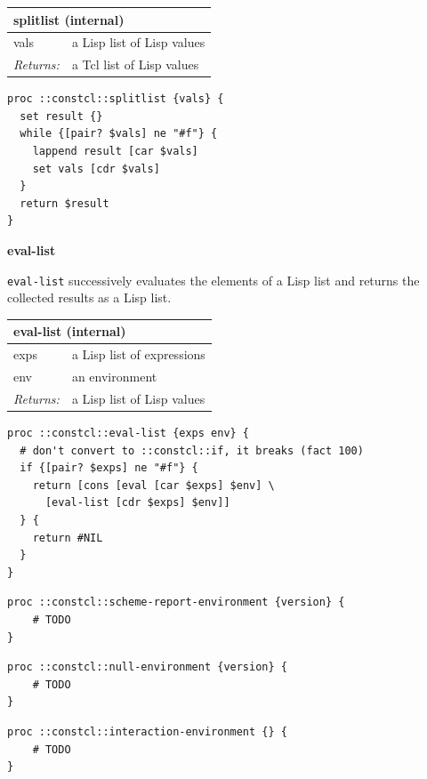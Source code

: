 \documentclass[twoside,9pt]{report}
\begin{document}
\begin{tabular}{ |l l| }
\hline
\multicolumn{2}{|l|}{splitlist (internal)} \\
\hline
vals & a Lisp list of Lisp values \\
\textit{Returns:} & a Tcl list of Lisp values \\
\hline
\end{tabular}

\noindent\makebox[\linewidth]{\rule{\linewidth}{0.4pt}}
\begin{lstlisting}
proc ::constcl::splitlist {vals} {
  set result {}
  while {[pair? $vals] ne "#f"} {
    lappend result [car $vals]
    set vals [cdr $vals]
  }
  return $result
}
\end{lstlisting}
\noindent\makebox[\linewidth]{\rule{\linewidth}{0.4pt}}

\textbf{eval-list}


\texttt{eval-list} successively evaluates the elements of a Lisp list and returns the collected results as a Lisp list.

\begin{tabular}{ |l l| }
\hline
\multicolumn{2}{|l|}{eval-list (internal)} \\
\hline
exps & a Lisp list of expressions \\
env & an environment \\
\textit{Returns:} & a Lisp list of Lisp values \\
\hline
\end{tabular}

\noindent\makebox[\linewidth]{\rule{\linewidth}{0.4pt}}
\begin{lstlisting}
proc ::constcl::eval-list {exps env} {
  # don't convert to ::constcl::if, it breaks (fact 100)
  if {[pair? $exps] ne "#f"} {
    return [cons [eval [car $exps] $env] \
      [eval-list [cdr $exps] $env]]
  } {
    return #NIL
  }
}
\end{lstlisting}
\noindent\makebox[\linewidth]{\rule{\linewidth}{0.4pt}}
\noindent\makebox[\linewidth]{\rule{\linewidth}{0.4pt}}
\begin{lstlisting}
proc ::constcl::scheme-report-environment {version} {
    # TODO
}
\end{lstlisting}
\noindent\makebox[\linewidth]{\rule{\linewidth}{0.4pt}}
\noindent\makebox[\linewidth]{\rule{\linewidth}{0.4pt}}
\begin{lstlisting}
proc ::constcl::null-environment {version} {
    # TODO
}
\end{lstlisting}
\noindent\makebox[\linewidth]{\rule{\linewidth}{0.4pt}}
\noindent\makebox[\linewidth]{\rule{\linewidth}{0.4pt}}
\begin{lstlisting}
proc ::constcl::interaction-environment {} {
    # TODO
}
\end{lstlisting}
\noindent\makebox[\linewidth]{\rule{\linewidth}{0.4pt}}
\end{document}
